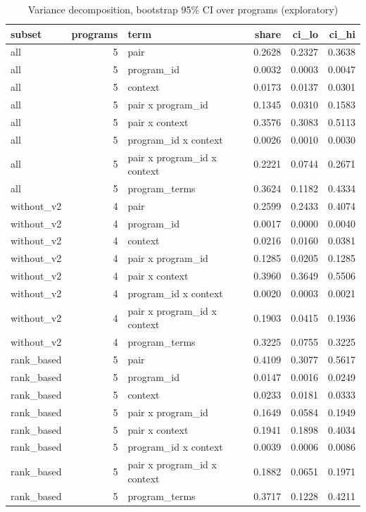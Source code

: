 \begin{table}[t]
\centering
\caption{Variance decomposition, bootstrap 95\% CI over programs (exploratory)}
\label{tab:v3-1-variance-decomposition}
\begin{tabular}{lrlrrr}
\toprule
subset & programs & term & share & ci\_lo & ci\_hi \\
\midrule
all & 5 & pair & 0.2628 & 0.2327 & 0.3638 \\
all & 5 & program\_id & 0.0032 & 0.0003 & 0.0047 \\
all & 5 & context & 0.0173 & 0.0137 & 0.0301 \\
all & 5 & pair x program\_id & 0.1345 & 0.0310 & 0.1583 \\
all & 5 & pair x context & 0.3576 & 0.3083 & 0.5113 \\
all & 5 & program\_id x context & 0.0026 & 0.0010 & 0.0030 \\
all & 5 & pair x program\_id x context & 0.2221 & 0.0744 & 0.2671 \\
all & 5 & program\_terms & 0.3624 & 0.1182 & 0.4334 \\
without\_v2 & 4 & pair & 0.2599 & 0.2433 & 0.4074 \\
without\_v2 & 4 & program\_id & 0.0017 & 0.0000 & 0.0040 \\
without\_v2 & 4 & context & 0.0216 & 0.0160 & 0.0381 \\
without\_v2 & 4 & pair x program\_id & 0.1285 & 0.0205 & 0.1285 \\
without\_v2 & 4 & pair x context & 0.3960 & 0.3649 & 0.5506 \\
without\_v2 & 4 & program\_id x context & 0.0020 & 0.0003 & 0.0021 \\
without\_v2 & 4 & pair x program\_id x context & 0.1903 & 0.0415 & 0.1936 \\
without\_v2 & 4 & program\_terms & 0.3225 & 0.0755 & 0.3225 \\
rank\_based & 5 & pair & 0.4109 & 0.3077 & 0.5617 \\
rank\_based & 5 & program\_id & 0.0147 & 0.0016 & 0.0249 \\
rank\_based & 5 & context & 0.0233 & 0.0181 & 0.0333 \\
rank\_based & 5 & pair x program\_id & 0.1649 & 0.0584 & 0.1949 \\
rank\_based & 5 & pair x context & 0.1941 & 0.1898 & 0.4034 \\
rank\_based & 5 & program\_id x context & 0.0039 & 0.0006 & 0.0086 \\
rank\_based & 5 & pair x program\_id x context & 0.1882 & 0.0651 & 0.1971 \\
rank\_based & 5 & program\_terms & 0.3717 & 0.1228 & 0.4211 \\
\bottomrule
\end{tabular}
\end{table}
